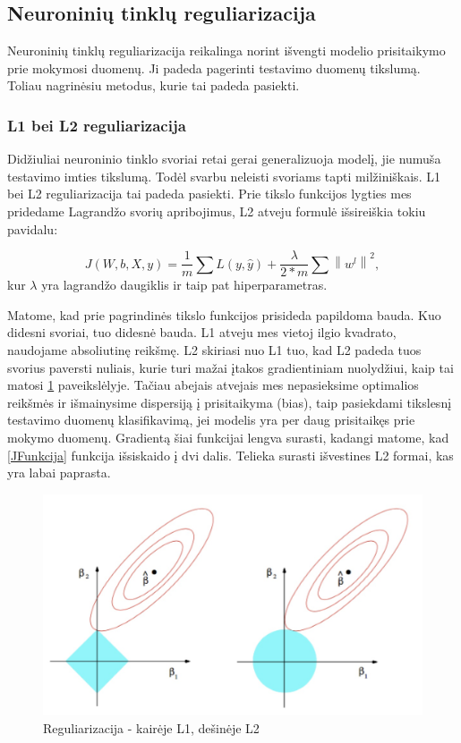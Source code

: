 \documentclass[a4paper, 12pt]{article}
\begin{document}
%
\subsection{Neuroninių tinklų reguliarizacija}
%

Neuroninių tinklų reguliarizacija reikalinga norint išvengti modelio prisitaikymo prie mokymosi duomenų. Ji padeda pagerinti testavimo duomenų tikslumą. Toliau nagrinėsiu metodus, kurie tai padeda pasiekti.

%
\subsubsection{L1 bei L2 reguliarizacija}
%

Didžiuliai neuroninio tinklo svoriai retai gerai generalizuoja modelį, jie numuša testavimo imties tikslumą. Todėl svarbu neleisti svoriams tapti milžiniškais. L1 bei L2 reguliarizacija tai padeda pasiekti. Prie tikslo funkcijos lygties mes pridedame Lagrandžo svorių apribojimus, L2 atveju formulė išsireiškia tokiu pavidalu:

\begin{equation}
\label{JFunkcija}
J(W, b, X, y)=\frac{1}{m} \sum L(y, \hat{y})+\frac{\lambda}{2 * m} \sum\left\|w^{l}\right\|^{2},
\end{equation}
kur $\lambda$ yra lagrandžo daugiklis ir taip pat hiperparametras.

Matome, kad prie pagrindinės tikslo funkcijos prisideda papildoma bauda. Kuo didesni svoriai, tuo didesnė bauda. L1 atveju mes vietoj ilgio kvadrato, naudojame absoliutinę reikšmę. L2 skiriasi nuo L1 tuo, kad L2 padeda tuos svorius paversti nuliais, kurie turi mažai įtakos gradientiniam nuolydžiui, kaip tai matosi \ref{regularization} paveikslėlyje. Tačiau abejais atvejais mes nepasieksime optimalios reikšmės ir išmainysime dispersiją į prisitaikyma (bias), taip pasiekdami tikslesnį testavimo duomenų klasifikavimą, jei modelis yra per daug prisitaikęs prie mokymo duomenų.
Gradientą šiai funkcijai lengva surasti, kadangi matome, kad \ref{JFunkcija} funkcija išsiskaido į dvi dalis. Telieka surasti išvestines L2 formai, kas yra labai paprasta.

\begin{figure}[h]
\centering
\includegraphics[width=1\textwidth]{regularization}
\caption{Reguliarizacija - kairėje L1, dešinėje L2}
\label{regularization}
\end{figure}
\end{document}
